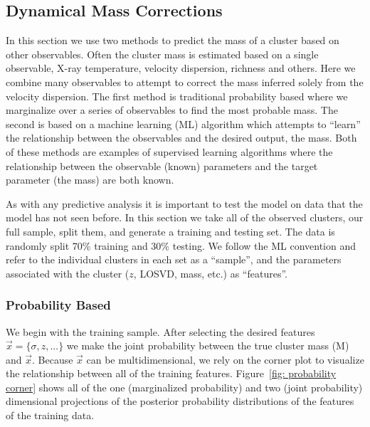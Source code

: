 \documentclass[fleqn,usenatbib]{mnras}
\begin{document}
\subsection{Dynamical Mass Corrections}
In this section we use two methods to predict the mass of a cluster based on other observables. Often the cluster mass is estimated based on a single observable, X-ray temperature, velocity dispersion, richness and others. Here we combine many observables to attempt to correct the mass inferred solely from the velocity dispersion. The first method is traditional probability based where we marginalize over a series of observables to find the most probable mass. The second is based on a machine learning (ML) algorithm which attempts to ``learn'' the relationship between the observables and the desired output, the mass. Both of these methods are examples of supervised learning algorithms where the relationship between the observable (known) parameters and the target parameter (the mass) are both known.

As with any predictive analysis it is important to test the model on data that the model has not seen before. In this section we take all of the observed clusters, our full sample, split them, and generate a training and testing set. The data is randomly split 70\% training and 30\% testing. We follow the ML convention and refer to the individual clusters in each set as a ``sample'', and the parameters associated with the cluster ($z$, LOSVD, mass, etc.) as ``features''.  

\subsubsection{Probability Based}\label{sec:probability method}
We begin with the training sample. After selecting the desired features $\vec{x} = \{\sigma, z, ...\}$ we make the joint probability between the true cluster mass (M) and $\vec{x}$. Because $\vec{x}$ can be multidimensional, we rely on the corner plot to visualize the relationship between all of the training features. Figure~\ref{fig: probability corner} shows all of the one (marginalized probability) and two (joint probability) dimensional projections of the posterior probability distributions of the features of the training data.
\end{document}
